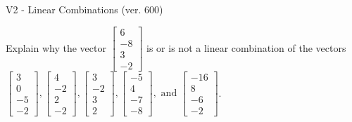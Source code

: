 \begin{exercise}
  \begin{exerciseTitle}V2 - Linear Combinations (ver. 600)\end{exerciseTitle}
  \begin{exerciseStatement}
    Explain why the vector \(\left[\begin{array}{c}
6 \\
-8 \\
3 \\
-2
\end{array}\right]\)  is or is not a linear 
	combination of the vectors \(\left[\begin{array}{c}
3 \\
0 \\
-5 \\
-2
\end{array}\right] , \left[\begin{array}{c}
4 \\
-2 \\
2 \\
-2
\end{array}\right] , \left[\begin{array}{c}
3 \\
-2 \\
3 \\
2
\end{array}\right] , \left[\begin{array}{c}
-5 \\
4 \\
-7 \\
-8
\end{array}\right] , \text{ and } \left[\begin{array}{c}
-16 \\
8 \\
-6 \\
-2
\end{array}\right]\).
	



\end{exerciseStatement}
\end{exercise}
